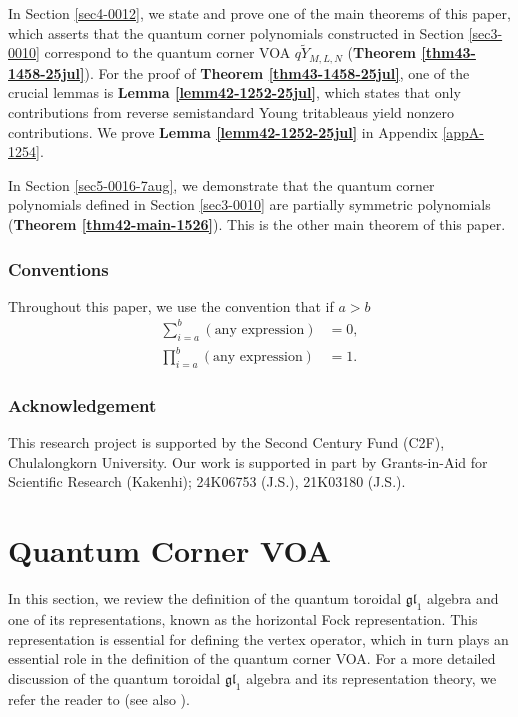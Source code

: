 \documentclass[12pt,reqno,a4paper]{amsart}
\newcommand{\fraks}[1]{\mathfrak{#1}}
\numberwithin{equation}{section}
\theoremstyle{definition}
\begin{document}
In Section \ref{sec4-0012}, we state and prove one of the main theorems of this paper, which asserts that the quantum corner polynomials constructed in Section \ref{sec3-0010} correspond to the quantum corner VOA $q\widetilde{Y}_{M,L,N}$ (\textbf{Theorem \ref{thm43-1458-25jul}}). For the proof of \textbf{Theorem \ref{thm43-1458-25jul}}, one of the crucial lemmas is \textbf{Lemma \ref{lemm42-1252-25jul}}, which states that only contributions from reverse semistandard Young tritableaus yield nonzero contributions. We prove \textbf{Lemma \ref{lemm42-1252-25jul}} in Appendix \ref{appA-1254}.

In Section \ref{sec5-0016-7aug}, we demonstrate that the quantum corner polynomials defined in Section \ref{sec3-0010} are partially symmetric polynomials (\textbf{Theorem \ref{thm42-main-1526}}). This is the other main theorem of this paper. 

\subsubsection*{Conventions}

Throughout this paper, we use the convention that if $a > b$
\begin{align}
	\displaystyle \sum_{i = a}^{b}(\text{any expression}) &= 0, 
	\\
	\displaystyle \prod_{i = a}^{b}(\text{any expression}) &= 1. 
	\label{eqn14-1159-sun17aug}
\end{align}



\subsubsection*{Acknowledgement}
This research project is supported by the Second Century Fund (C2F), Chulalongkorn University. 
Our work is supported in part by Grants-in-Aid for Scientific Research (Kakenhi); 24K06753 (J.S.), 21K03180 (J.S.).
	
\section{Quantum Corner VOA}
\label{sec2-0010}

In this section, we review the definition of the quantum toroidal $\fraks{gl}_1$ algebra and one of its representations, known as the horizontal Fock representation. This representation is essential for defining the vertex operator, which in turn plays an essential role in the definition of the quantum corner VOA. For a more detailed discussion of the quantum toroidal $\fraks{gl}_1$ algebra and its representation theory, we refer the reader to \cite{Awata-note}  \cite{BS}  \cite{DI}   \cite{FHHSY-comm} \cite{feigin-toroidal1, feigin-toroidal2,feigin-toroidal3}
\cite{Miki} \cite{Sch} 
(see also \cite{	AFS, AKMM17 , AKMM17-2 , AKMM18 , BFM17, BFM17-2 ,BJ, CK,CK2,Ma,Zen}). 
\end{document}

